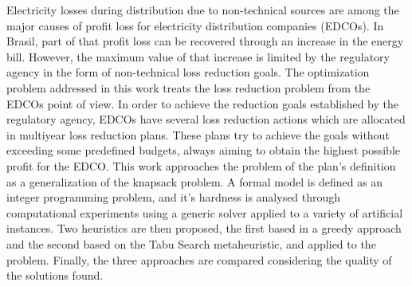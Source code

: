 Electricity losses during distribution due to non-technical sources are among the major causes of 
profit loss for electricity distribution companies (EDCOs). In Brasil, part of that profit loss can be
recovered through an increase in the energy bill. However, the maximum value of that increase is 
limited by the regulatory agency in the form of non-technical loss reduction goals. The optimization 
problem addressed in this work treats the loss reduction problem from the EDCOs point of view. 
In order to achieve the reduction goals established by the regulatory agency, EDCOs
have several loss reduction actions which are allocated in multiyear loss reduction plans. 
These plans try to achieve the goals without exceeding some predefined budgets,
always aiming to obtain the highest possible profit for the EDCO. This work approaches
the problem of the plan's definition as a generalization of the knapsack problem.
A formal model is defined as an integer programming problem, and it's hardness is analysed
through computational experiments using a generic solver applied to a variety of
artificial instances. Two heuristics are then proposed, the first
based in a greedy approach and the second based on the Tabu Search metaheuristic, and applied
to the problem. Finally, the three approaches are compared considering the quality of the
solutions found.

